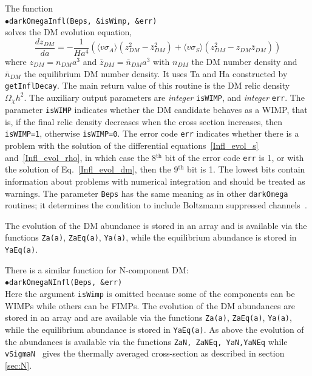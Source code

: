 \documentclass[12pt,a4paper]{article}
\begin{document}
The function \\ 
$\bullet$\verb|darkOmegaInfl(Beps, &isWimp, &err) |\\
solves the DM evolution equation,
\begin{equation}
 \label{Infl_evol_dm} 
 \frac{dz_{DM}}{da}= -\frac{1}{ H a^4}\left( \langle v\sigma_A\rangle \left( z_{DM}^2 -\bar{z}_{DM}^2\right)+\langle v\sigma_S\rangle \left(z_{DM}^2-z_{DM} \bar{z}_{DM}\right)  \right)
\end{equation}
 where  $z_{DM} = n_{DM} a^3$ and $\bar{z}_{DM}=\bar{n}_{DM} a^3$ with $n_{DM}$  the  DM number density and  $\bar{n}_{DM}$  the equilibrium DM number density.   
It uses Ta and Ha constructed by \verb|getInflDecay|. The main return value of this routine is the DM relic density $\Omega_\chi h^2$. The auxiliary output parameters are {\it integer} {\tt isWIMP}, and {\it integer} {\tt err}. The parameter {\tt isWIMP} indicates whether the DM candidate behaves as a WIMP, that is, if the final relic density decreases when the cross section increases, then {\tt isWIMP=1}, otherwise {\tt isWIMP=0}. The error code {\tt err}  indicates whether there is a problem with the solution of the differential equations~\eqref{Infl_evol_s} and~\eqref{Infl_evol_rho}, in which case the 8$^\text{th}$ bit of the error code {\tt err} is 1, or with the solution of Eq.~\eqref{Infl_evol_dm}, then the 9$^\text{th}$ bit is 1. The lowest bits contain information about problems with numerical integration and should be treated as warnings. The parameter \verb|Beps| has the same meaning as in other \verb|darkOmega| routines; it determines the condition to include Boltzmann suppressed channels~\cite{Belanger:2001fz}.

The evolution of the DM abundance is stored in an array and is available via the functions {\tt Za(a)}, {\tt ZaEq(a)}, \verb|Ya(a)|, while the equilibrium abundance is stored in \verb|YaEq(a)|.
   

There is a similar function for N-component DM:\\
$\bullet$\verb|darkOmegaNInfl(Beps, &err)|\\
Here the argument  {\tt isWimp} is omitted  because some of the components can be WIMPs while others can be FIMPs. 
The evolution of the DM abundances are stored in an array and are available via the functions {\tt Za(a)}, {\tt ZaEq(a)}, \verb|Ya(a)|, while the equilibrium abundance is stored in \verb|YaEq(a)|. As above the evolution of the abundances is available via the functions 
 {\tt ZaN,  ZaNEq, YaN,YaNEq} while {\tt vSigmaN } gives the thermally averaged cross-section as described in section \ref{sec:N}.
\end{document}
